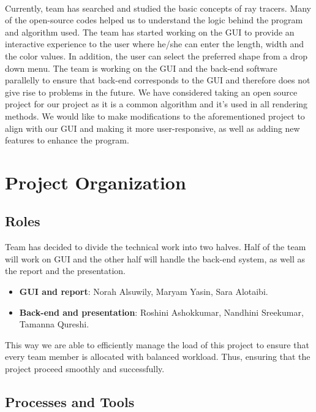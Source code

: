 \documentclass{article}
\begin{document}
\paragraph{}
Currently, team has searched and studied the basic concepts of ray tracers. Many of the open-source codes helped us to understand the logic behind the program and algorithm used. The team has started working on the GUI to provide an interactive experience to the user where he/she can enter the length, width and the color values. In addition, the user can select the preferred shape from a drop down menu. 
\newline 
The team is working on the GUI and the back-end software parallelly to ensure that back-end corresponds to the GUI and therefore does not give rise to problems in the future. We have considered taking an open source project for our project as it is a common algorithm and it's used in all rendering methods. We would like to make modifications to the aforementioned project to align with our GUI and making it more user-responsive, as well as adding new features to enhance the program. 




\section{Project Organization}

\subsection{Roles}
Team has decided to divide the technical work into two halves. Half of the team will work on GUI and the other half will handle the back-end system, as well as the report and the presentation.  
\begin{itemize}

\item \textbf{GUI and report}: Norah Alsuwily, Maryam Yasin, Sara Alotaibi. 
\item \textbf{Back-end and presentation}: Roshini Ashokkumar, Nandhini Sreekumar, Tamanna Qureshi. 

\end{itemize}

This way we are able to efficiently manage the load of this project to ensure that every team member is allocated with balanced workload. Thus, ensuring that the project proceed smoothly and successfully. 


\subsection{Processes and Tools}
\end{document}
